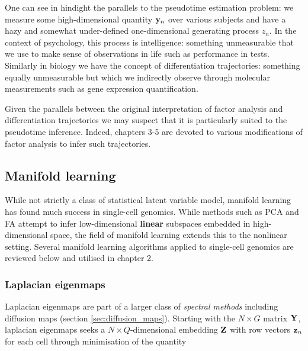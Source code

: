 One can see in hindight the parallels to the pseudotime estimation problem: we measure some high-dimensional quantity $\mathbf{y}_n$ over various subjects and have a hazy and somewhat under-defined one-dimensional generating process $z_n$. In the context of psychology, this process is intelligence: something unmeasurable that we use to make sense of observations in life such as performance in tests. Similarly in biology we have the concept of differentiation trajectories: something equally unmeasurable but which we indirectly observe through molecular measurements such as gene expression quantification.

Given the parallels between the original interpretation of factor analysis and differentiation trajectories we may suspect that it is particularly suited to the pseudotime inference. Indeed, chapters 3-5 are devoted to various modifications of factor analysis to infer such trajectories.




\subsection{Manifold learning} \label{sec:int:manifold}

While not strictly a class of statistical latent variable model, manifold learning has found much success in single-cell genomics. While methods such as PCA and FA attempt to infer low-dimensional \textbf{linear} subspaces embedded in high-dimensional space, the field of manifold learning extends this to the nonlinear setting. Several manifold learning algorithms applied to single-cell genomics are reviewed below and utilised in chapter 2.

\subsubsection{Laplacian eigenmaps}

Laplacian eigenmaps \cite{Belkin2003} are part of a larger class of \emph{spectral methods} including diffusion maps (section \ref{sec:diffusion_maps}). Starting with the $N \times G$ matrix $\mathbf{Y}$, laplacian eigenmaps seeks a $N \times Q$-dimensional embedding $\mathbf{Z}$ with row vectors $\mathbf{z}_n$ for each cell through minimisation of the quantity

